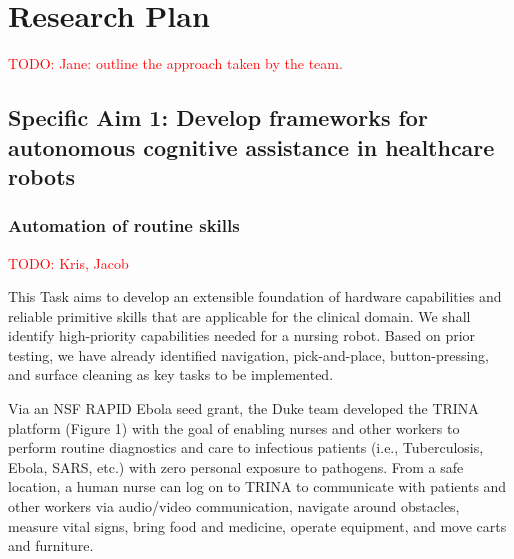 \pagebreak

\section{Research Plan}\label{sec:plan}
\textcolor{red}{TODO: Jane: outline the approach taken by the team.}

\subsection{Specific Aim 1: Develop frameworks for autonomous cognitive assistance in healthcare robots}\label{sec:plan-task1}

\subsubsection{Automation of routine skills}
\textcolor{red}{TODO: Kris, Jacob}

This Task aims to develop an extensible foundation of hardware capabilities and reliable primitive skills that are applicable for the clinical domain.  We shall identify high-priority capabilities needed for a nursing robot.  Based on prior testing, we have already identified navigation, pick-and-place,
button-pressing, and surface cleaning as key tasks to be implemented.

Via  an  NSF  RAPID  Ebola  seed  grant,  the  Duke  team  developed  the  TRINA
platform (Figure 1) with the goal of enabling nurses and other workers to perform routine diagnostics and
care to infectious patients (i.e., Tuberculosis, Ebola, SARS, etc.) with zero personal exposure to pathogens. From a safe location, a human nurse can log on to TRINA to communicate with patients and other workers
via audio/video communication, navigate around obstacles, measure vital signs, bring food and medicine,
operate equipment, and move carts and furniture.

